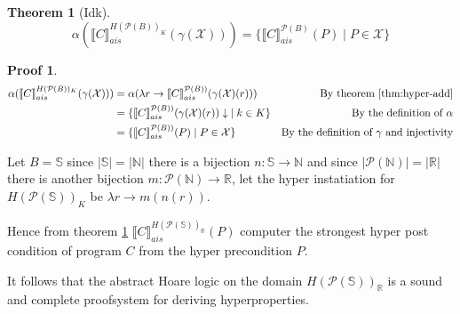 \documentclass{article}
\newtheorem{theorem}{Theorem}
\newtheorem{proofs}{Proof}
\def\rr{\rightarrow}
\newcommand*{\sem}[1]{
    \llbracket #1 \rrbracket
}
\newcommand{\bca}[2]{
    #2_{ais}^{#1}
}
\newcommand{\bsem}[2][A]{
    \bca{#1}{\sem{#2}}
}
\newcommand{\pow}[1]{
    \mathcal{P}(#1)
}
\def\rr{\rightarrow}
\def\state{\mathbb{S}}
\begin{document}
    \begin{theorem}[Idk]\label{thm:hyperpost} 
        $$\alpha(\bsem[H(\pow{B})_K]{C}(\gamma(\mathcal{X}))) = 
        \{ \bsem[\pow{B}]{C}(P) \mid P \in \mathcal{X} \}$$
    \end{theorem}
    \begin{proofs}
        \begin{align*}
            \alpha(\bsem[H(\pow{B})_K]{C}(\gamma(\mathcal{X})))
                &= \alpha(\lambda r \rr 
                    \bsem[\pow{B})]{C}(\gamma(\mathcal{X})(r)))
                &\text{By theorem \ref{thm:hyper-add}} \\
                &= \{ \bsem[\pow{B})]{C}(\gamma(\mathcal{X})(r))\downarrow \;
                    \mid k \in K \}
                &\text{By the definition of $\alpha$}\\
                &= \{ \bsem[\pow{B})]{C}(P) \mid P \in \mathcal{X} \}
                &\text{By the definition of $\gamma$ and injectivity}\\
        \end{align*}
    \end{proofs}

    Let $B = \state$ since $|\state| = |\mathbb{N}|$ there is a bijection $n:
    \state \rr \mathbb{N}$ and since $|\pow{\mathbb{N}}| = |\mathbb{R}|$ there is
    another bijection $m : \pow{\mathbb{N}} \rr \mathbb{R}$,
    let the hyper instatiation for $H(\pow{\state})_K$ be $\lambda r \rr 
    m(n(r))$.

    Hence from theorem \ref{thm:hyperpost} 
    $\bsem[H(\pow{\state})_\mathbb{R}]{C}(P)$ computer the strongest hyper 
    post condition of program $C$ from the hyper precondition $P$.

    It follows that the abstract Hoare logic on the domain 
    $H(\pow{\state})_\mathbb{R}$ is a sound and complete proofsystem for
    deriving hyperproperties.
\end{document}
